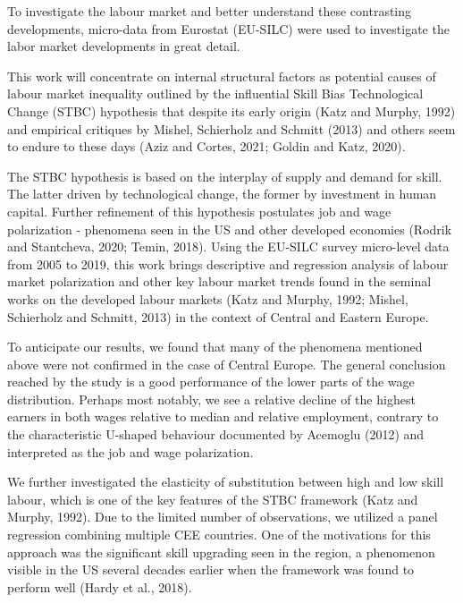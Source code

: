 \documentclass{article}
\begin{document}
To investigate the labour market and better understand these contrasting developments, micro-data from Eurostat (EU-SILC) were used to investigate the labor market developments in great detail.

This work will concentrate on internal structural factors as potential causes of labour market inequality outlined by the influential Skill Bias Technological Change (STBC) hypothesis that despite its early origin (Katz and Murphy, 1992) and empirical critiques by Mishel, Schierholz and Schmitt (2013) and others seem to endure to these days (Aziz and Cortes, 2021; Goldin and Katz, 2020). 

The STBC hypothesis is based on the interplay of supply and demand for skill. The latter driven by technological change, the former by investment in human capital. Further refinement of this hypothesis postulates job and wage polarization - phenomena seen in the US and other developed economies (Rodrik and Stantcheva, 2020; Temin, 2018). Using the EU-SILC survey micro-level data from 2005 to 2019, this work brings descriptive and regression analysis of labour market polarization and other key labour market trends found in the seminal works on the developed labour markets (Katz and Murphy, 1992; Mishel, Schierholz and Schmitt, 2013) in the context of Central and Eastern Europe.

To anticipate our results, we found that many of the phenomena mentioned above were not confirmed in the case of Central Europe. The general conclusion reached by the study is a good performance of the lower parts of the wage distribution. Perhaps most notably, we see a relative decline of the highest earners in both wages relative to median and relative employment, contrary to the characteristic U-shaped behaviour documented by Acemoglu (2012) and interpreted as the job and wage polarization. %

We further investigated the elasticity of substitution between high and low skill labour, which is one of the key features of the STBC framework (Katz and Murphy, 1992). Due to the limited number of observations, we utilized a panel regression combining multiple CEE countries. One of the motivations for this approach was the significant skill upgrading seen in the region, a phenomenon visible in the US several decades earlier when the framework was found to perform well (Hardy et al., 2018).
\end{document}
